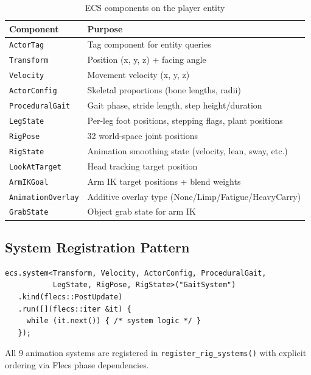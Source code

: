 \documentclass[11pt,a4paper]{article}
\begin{document}
\begin{table}[h]
\centering
\caption{ECS components on the player entity}
\label{tab:components}
\begin{tabular}{@{}lp{8cm}@{}}
\toprule
\textbf{Component} & \textbf{Purpose} \\
\midrule
\texttt{ActorTag}         & Tag component for entity queries \\
\texttt{Transform}        & Position (x, y, z) + facing angle \\
\texttt{Velocity}         & Movement velocity (x, y, z) \\
\texttt{ActorConfig}      & Skeletal proportions (bone lengths, radii) \\
\texttt{ProceduralGait}   & Gait phase, stride length, step height/duration \\
\texttt{LegState}         & Per-leg foot positions, stepping flags, plant positions \\
\texttt{RigPose}          & 32 world-space joint positions \\
\texttt{RigState}         & Animation smoothing state (velocity, lean, sway, etc.) \\
\texttt{LookAtTarget}     & Head tracking target position \\
\texttt{ArmIKGoal}        & Arm IK target positions + blend weights \\
\texttt{AnimationOverlay} & Additive overlay type (None/Limp/Fatigue/HeavyCarry) \\
\texttt{GrabState}        & Object grab state for arm IK \\
\bottomrule
\end{tabular}
\end{table}

\subsection{System Registration Pattern}

\begin{lstlisting}[caption={Flecs system registration}]
ecs.system<Transform, Velocity, ActorConfig, ProceduralGait,
           LegState, RigPose, RigState>("GaitSystem")
   .kind(flecs::PostUpdate)
   .run([](flecs::iter &it) {
     while (it.next()) { /* system logic */ }
   });
\end{lstlisting}

All 9 animation systems are registered in \texttt{register\_rig\_systems()} with explicit ordering via Flecs phase dependencies.
\end{document}
